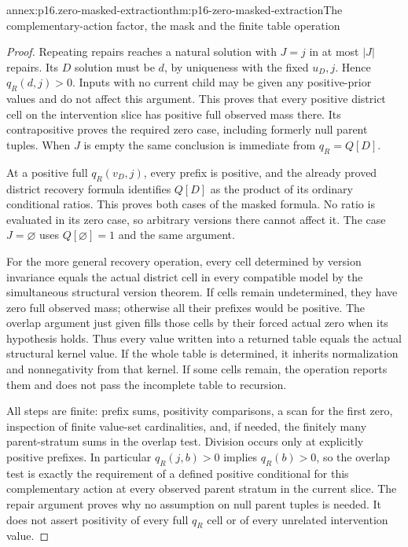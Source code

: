 \begin{annexitem}{annex:p16.zero-masked-extraction}{thm:p16-zero-masked-extraction}{The complementary-action factor, the mask and the finite table operation}
\begin{proof}
Repeating repairs reaches a natural solution with \(J=j\) in
at most \(|J|\) repairs. Its \(D\) solution must be \(d\),
by uniqueness with the fixed \(u_D,j\). Hence
\(q_R(d,j)>0\). Inputs with no current child may be given any
positive-prior values and do not affect this argument. This proves
that every positive district cell on the intervention slice has
positive full observed mass there. Its contrapositive proves the
required zero case, including formerly null parent tuples. When
\(J\) is empty the same conclusion is immediate from \(q_R=Q[D]\).

At a positive full \(q_R(v_D,j)\), every prefix is positive,
and the already proved district recovery formula identifies
\(Q[D]\) as the product of its ordinary conditional ratios.
This proves both cases of the masked formula. No ratio is evaluated
in its zero case, so arbitrary versions there cannot affect it.
The case \(J=\varnothing\) uses \(Q[\varnothing]=1\)
and the same argument.

For the more general recovery operation, every cell determined
by version invariance equals the actual district cell in every
compatible model by the simultaneous structural version theorem.
If cells remain undetermined, they have zero full observed mass;
otherwise all their prefixes would be positive. The overlap
argument just given fills those cells by their forced actual zero
when its hypothesis holds. Thus every value written into a returned
table equals the actual structural kernel value. If the whole
table is determined, it inherits normalization and nonnegativity
from that kernel. If some cells remain, the operation reports
them and does not pass the incomplete table to recursion.

All steps are finite: prefix sums, positivity comparisons, a scan
for the first zero, inspection of finite value-set cardinalities,
and, if needed, the finitely many parent-stratum sums in the
overlap test. Division occurs only at explicitly positive prefixes.
In particular \(q_R(j,b)>0\) implies \(q_R(b)>0\), so
the overlap test is exactly the requirement of a defined positive
conditional for this complementary action at every observed parent
stratum in the current slice. The repair argument proves why no
assumption on null parent tuples is needed. It does not assert positivity of
every full \(q_R\) cell or of every unrelated intervention value.
\end{proof}
\end{annexitem}

